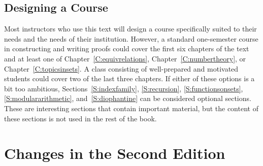 \subsection*{Designing a Course}
Most instructors who use this text will design a course specifically suited to their needs and the needs of their institution.  However, a standard one-semester course in constructing and writing proofs could cover the first six chapters of the text and at least one of Chapter~\ref{C:equivrelations}, Chapter~\ref{C:numbertheory}, or Chapter~\ref{C:topicsinsets}.  A class consisting of well-prepared and motivated students could cover two of the last three chapters.  If either of these options is a bit too ambitious, Sections~\ref{S:indexfamily}, 
\ref{S:recursion}, \ref{S:functionsonsets}, \ref{S:modulararithmetic}, 
and~\ref{S:diophantine} can be considered optional sections.  These are interesting sections that contain important material, but the content of these sections is not used in the rest of the book.  
%
%

\section*{Changes in the Second Edition}
